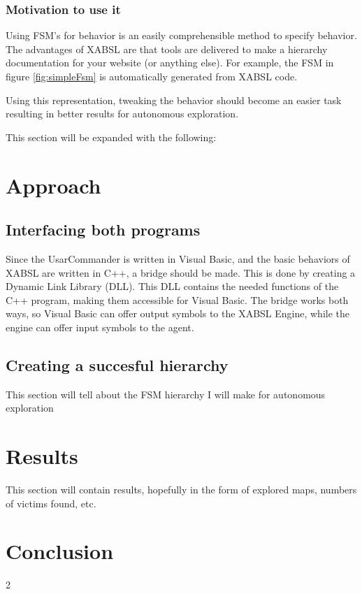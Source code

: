 \documentclass[a4paper,10pt]{article}
\begin{document}
\begin{multicols}{2}
\subsubsection{Motivation to use it}
Using FSM's for behavior is an easily comprehensible method to specify behavior.
The advantages of XABSL are that tools are delivered to make a hierarchy
documentation for your website (or anything else). For example, the FSM in
figure \ref{fig:simpleFsm} is automatically generated from XABSL code.

Using this representation, tweaking the behavior should become an easier task
resulting in better results for autonomous exploration.

This section will be expanded with the following: 

\section{Approach}

\subsection{Interfacing both programs}
Since the UsarCommander is written in Visual Basic, and the basic behaviors of
XABSL are written in C++, a bridge should be made. This is done by creating a
Dynamic Link Library (DLL). This DLL contains the needed functions of the C++
program, making them accessible for Visual Basic. The bridge works both ways, so
Visual Basic can offer output symbols to the XABSL Engine, while the engine can
offer input symbols to the agent.

\subsection{Creating a succesful hierarchy}
This section will tell about the FSM hierarchy I will make for autonomous
exploration


\section{Results}
This section will contain results, hopefully in the form of explored maps, numbers of victims found, etc.

\section{Conclusion}

\end{multicols}{2}
{}

\end{document}
